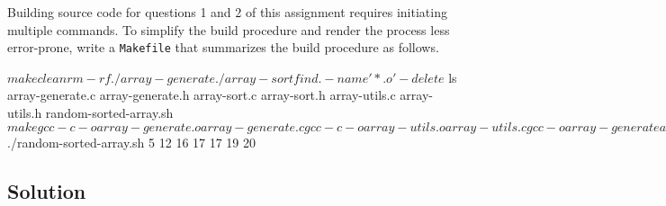 \documentclass[12pt,letterpaper,twoside]{article}
\begin{document}
Building source code for questions 1 and 2 of this assignment requires initiating multiple commands.
To simplify the build procedure and render the process less error-prone, write a \texttt{Makefile} that summarizes the build procedure as follows.

\begin{terminal}
$ make clean
rm -rf ./array-generate ./array-sort
find . -name '*.o' -delete
$ ls
array-generate.c array-generate.h array-sort.c array-sort.h
array-utils.c array-utils.h random-sorted-array.sh
$ make
gcc -c -o array-generate.o array-generate.c
gcc -c -o array-utils.o array-utils.c
gcc -o array-generate array-generate.o array-utils.o -Werror -Wall -std=gnu99 -I.
gcc -c -o array-sort.o array-sort.c
gcc -o array-sort array-sort.o array-utils.o -Werror -Wall -std=gnu99 -I.
$ ./random-sorted-array.sh
5 12 16 17 17 19 20
\end{terminal}

\subsection*{Solution}

\lstset{language=[gnu]make,tabsize=4}

\end{document}
